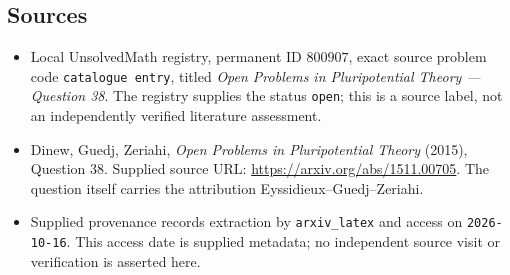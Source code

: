 \documentclass[11pt]{article}
\begin{document}
\subsection{Sources}
\begin{itemize}
\item Local UnsolvedMath registry, permanent ID \(800907\), exact source problem code \texttt{catalogue entry}, titled \emph{Open Problems in Pluripotential Theory --- Question 38}. The registry supplies the status \texttt{open}; this is a source label, not an independently verified literature assessment.
\item Dinew, Guedj, Zeriahi, \emph{Open Problems in Pluripotential Theory} (2015), Question 38. Supplied source URL: \url{https://arxiv.org/abs/1511.00705}. The question itself carries the attribution Eyssidieux--Guedj--Zeriahi.
\item Supplied provenance records extraction by \texttt{arxiv\_latex} and access on \texttt{2026-10-16}. This access date is supplied metadata; no independent source visit or verification is asserted here.
\end{itemize}
\end{document}
